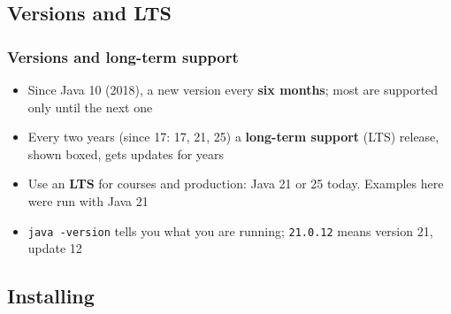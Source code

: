\documentclass[aspectratio=169,10pt,compress]{beamer}
\begin{document}
\subsection[Versions]{Versions and LTS}




\begin{frame}[t,fragile] \frametitle{Versions and long-term support}
  \begin{center}
  \end{center}
  \begin{itemize}\small
    \item Since Java 10 (2018), a new version every \textbf{six months}; most are supported only until the next one
    \item Every two years (since 17: 17, 21, 25) a \textbf{long-term support} (LTS) release, \colorbox{orange!20}{shown boxed}, gets updates for years
    \item Use an \textbf{LTS} for courses and production: Java 21 or 25 today. Examples here were run with Java 21
    \item \texttt{java -version} tells you what you are running; \texttt{21.0.12} means version 21, update 12
  \end{itemize}
\end{frame}

\subsection[Install]{Installing}
\end{document}
